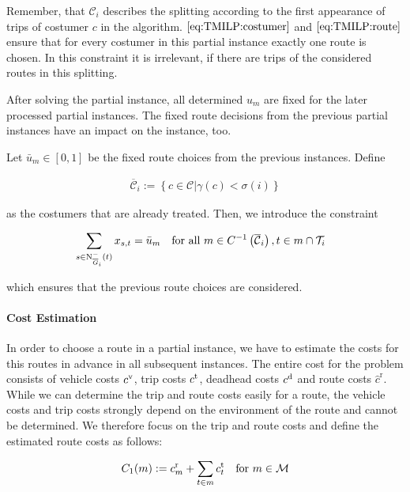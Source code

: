 Remember, that $\mathcal{C}_i$ describes the splitting according to the first appearance of trips of costumer $c$ in the algorithm. $\eqref{eq:TMILP:costumer}$ and $\eqref{eq:TMILP:route}$ ensure that for every costumer in this partial instance exactly one route is chosen. In this constraint it is irrelevant, if there are trips of the considered routes in this splitting. 

After solving the partial instance, all determined $u_m$ are fixed for the later processed partial instances. The fixed route decisions from the previous partial instances have an impact on the instance, too. 

Let $\bar{u}_m\in[0,1]$ be the fixed route choices from the previous instances. Define

\begin{align}
	\overline{\mathcal{C}}_i := \left\{c\in\mathcal{C}|\gamma\left(c\right)<\sigma(i)\right\}
\end{align}

as the costumers that are already treated. Then, we introduce the constraint

\begin{align}
	&\sum_{s\in\operatorname{N}_{\overline{G}_i}^-(t)} x_{s,t} = \bar{u}_m && \text{for all } m\in C^{-1}\left(\overline{\mathcal{C}}_i\right), t\in m\cap\mathcal{T}_i \label{eq:TMILP:route_fix}
\end{align}

which ensures that the previous route choices are considered.

\paragraph{Cost Estimation} \parfill

In order to choose a route in a partial instance, we have to estimate the costs for this routes in advance in all subsequent instances. The entire cost for the problem consists of vehicle costs $c^{\operatorname{v}}$, trip costs $c^{\operatorname{t}}$, deadhead costs $c^{\operatorname{d}}$ and route costs $\hat{c}^{\operatorname{r}}$. While we can determine the trip and route costs easily for a route, the vehicle costs and trip costs strongly depend on the environment of the route and cannot be determined. We therefore focus on the trip and route costs and define the estimated route costs as follows:

\begin{align}
\label{eq:estimated_route}
	C_1(m) := c^{\operatorname{r}}_m + \sum_{t\in m}c^{\operatorname{t}}_t && \text{for } m\in\mathcal{M}
\end{align}

